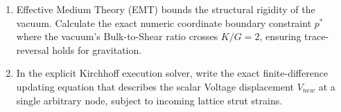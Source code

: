 \begin{exercisebox}
\begin{enumerate}
    \item Effective Medium Theory (EMT) bounds the structural rigidity of the vacuum. Calculate the exact numeric coordinate boundary constraint $p^*$ where the vacuum's Bulk-to-Shear ratio crosses $K/G = 2$, ensuring trace-reversal holds for gravitation.
    \item In the explicit Kirchhoff execution solver, write the exact finite-difference updating equation that describes the scalar Voltage displacement $V_{new}$ at a single arbitrary node, subject to incoming lattice strut strains.
\end{enumerate}
\end{exercisebox}